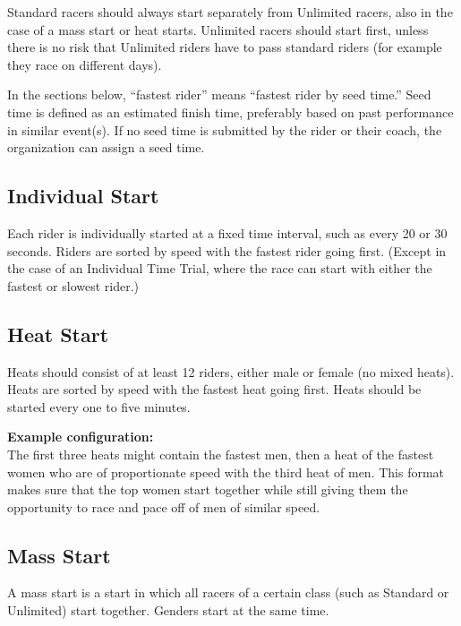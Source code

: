 Standard racers should always start separately from Unlimited racers, also in the case of a mass start or heat starts.
Unlimited racers should start first, unless there is no risk that Unlimited riders have to pass standard riders (for example they race on different days).

In the sections below, ``fastest rider'' means ``fastest rider by seed time.'' Seed time is defined as an estimated finish time, preferably based on past performance in similar event(s).
If no seed time is submitted by the rider or their coach, the organization can assign a seed time.

\subsection{Individual Start \label{subsec:road_heat-assignment_individual-start}}

Each rider is individually started at a fixed time interval, such as every 20 or 30 seconds.
Riders are sorted by speed with the fastest rider going first.
(Except in the case of an Individual Time Trial, where the race can start with either the fastest or slowest rider.)

\subsection{Heat Start \label{subsec:road_heat-assignment_heat-start}}

Heats should consist of at least 12 riders, either male or female (no mixed heats). %
Heats are sorted by speed with the fastest heat going first.
Heats should be started every one to five minutes.

\textbf{Example configuration:}\\
The first three heats might contain the fastest men, then a heat of the fastest women who are of proportionate speed with the third heat of men.
This format makes sure that the top women start together while still giving them the opportunity to race and pace off of men of similar speed.

\subsection{Mass Start \label{subsec:road_heat-assignment_mass-start}}

A mass start is a start in which all racers of a certain class (such as Standard or Unlimited) start together.
Genders start at the same time.

